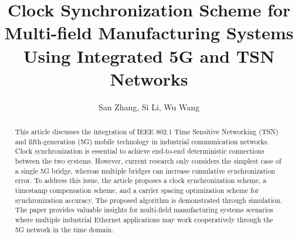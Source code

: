 \documentclass[english]{cccconf}
\begin{document}
\title{Clock Synchronization Scheme for Multi-field Manufacturing Systems Using Integrated 5G and TSN Networks}
	

\author{San Zhang,
	Si Li,
	Wu Wang}




\maketitle
\begin{abstract}
This article discusses the integration of IEEE 802.1 Time Sensitive Networking (TSN) and fifth-generation (5G) mobile technology in industrial communication networks. Clock synchronization is essential to achieve end-to-end deterministic connections between the two systems. However, current research only considers the simplest case of a single 5G bridge, whereas multiple bridges can increase cumulative synchronization error. To address this issue, the article proposes a clock synchronization scheme, a timestamp compensation scheme, and a carrier spacing optimization scheme for synchronization accuracy. The proposed algorithm is demonstrated through simulation. The paper provides valuable insights for multi-field manufacturing systems scenarios where multiple industrial Ethernet applications may work cooperatively through the 5G network in the time domain.
\end{abstract}

\end{document}
